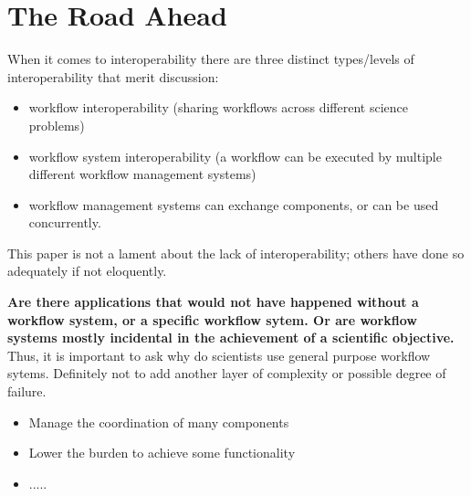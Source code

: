 \section{The Road Ahead}

When it comes to interoperability there are three distinct types/levels of interoperability that merit discussion:

\begin{itemize}

\item workflow interoperability (sharing workflows across different science
problems)

\item workflow system interoperability (a workflow can be executed by multiple
different workflow management systems)

\item workflow management systems can exchange components, or can be used
concurrently.

\end{itemize}

This paper is not a lament about the lack of interoperability; others have done so 
adequately if not eloquently.



{\bf Are there applications that would not have happened without a workflow
system, or a specific workflow sytem. Or are workflow systems mostly
incidental in the achievement of a scientific objective.} Thus, it is
important to ask why do scientists use general purpose workflow sytems.
Definitely not to add another layer of complexity or possible degree of
failure.

\begin{itemize}

\item Manage the coordination of many components
\item Lower the burden to achieve some functionality
\item .....

\end{itemize}



